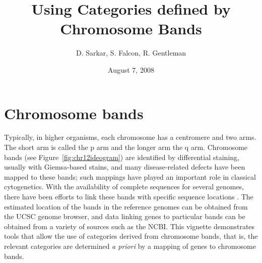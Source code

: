 \documentclass[11pt]{article}
\title{Using Categories defined by Chromosome Bands}
\author{D. Sarkar, S. Falcon, R. Gentleman}
\date{August 7, 2008}
\newcommand{\Rpackage}[1]{{\textsf{#1}}}
\begin{document}


\maketitle









\section{Chromosome bands}

Typically, in higher organisms, each chromosome has a centromere and
two arms.  The short arm is called the p arm and the longer arm the q
arm.  Chromosome bands (see Figure~\ref{fig:chr12ideogram}) are
identified by differential staining, usually with Giemsa-based stains,
and many disease-related defects have been mapped to these bands; such
mappings have played an important role in classical cytogenetics.
With the availability of complete sequences for several genomes, there
have been efforts to link these bands with specific sequence locations
\citep{FureyHaussler}.  The estimated location of the bands in the
reference genomes can be obtained from the UCSC genome browser, and
data linking genes to particular bands can be obtained from a variety
of sources such as the NCBI.  This vignette demonstrates tools that
allow the use of categories derived from chromosome bands, that is,
the relevant categories are determined \textit{a priori} by a mapping
of genes to chromosome bands.
\end{document}
